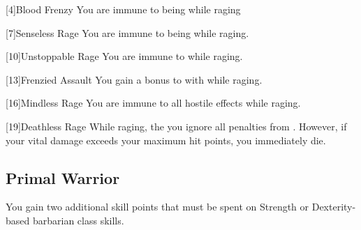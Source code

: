         [4]{Blood Frenzy}
        You are immune to being  while raging

        [7]{Senseless Rage}
        You are immune to being  while raging.

        [10]{Unstoppable Rage}
        You are immune to   while raging.

        [13]{Frenzied Assault}
        You gain a  bonus to  with  while raging.

        [16]{Mindless Rage} 
        You are immune to all hostile  effects while raging.

        [19]{Deathless Rage} 
        While raging, the you ignore all penalties from .
        However, if your vital damage exceeds your maximum hit points, you immediately die.

    \subsection{Primal Warrior}
         You gain two additional skill points that must be spent on Strength or Dexterity-based barbarian class skills.

